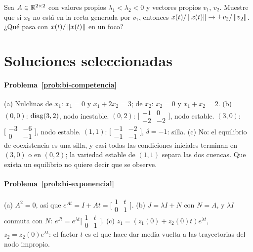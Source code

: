 \begin{problema}\label{prob:bi-tangente}
\etiquetaEstrella{} Sea $A\in\mathbb{R}^{2\times2}$ con valores propios $\lambda_1<\lambda_2<0$ y vectores propios $v_1$, $v_2$. Muestre que si $x_0$ no está en la recta generada por $v_1$, entonces $x(t)/\left\lVert x(t)\right\rVert\to\pm v_2/\left\lVert v_2\right\rVert$. ¿Qué pasa con $x(t)/\left\lVert x(t)\right\rVert$ en un foco?
\end{problema}

\section{Soluciones seleccionadas}

\paragraph{Problema~\ref{prob:bi-competencia}}
(a) Nulclinas de $x_1$: $x_1=0$ y $x_1+2x_2=3$; de $x_2$: $x_2=0$ y $x_1+x_2=2$. (b) $(0,0)$: $\operatorname{diag}(3,2)$, nodo inestable. $(0,2)$: $\bigl[\begin{smallmatrix}-1&0\\-2&-2\end{smallmatrix}\bigr]$, nodo estable. $(3,0)$: $\bigl[\begin{smallmatrix}-3&-6\\0&-1\end{smallmatrix}\bigr]$, nodo estable. $(1,1)$: $\bigl[\begin{smallmatrix}-1&-2\\-1&-1\end{smallmatrix}\bigr]$, $\delta=-1$: silla. (c) No: el equilibrio de coexistencia es una silla, y casi todas las condiciones iniciales terminan en $(3,0)$ o en $(0,2)$; la variedad estable de $(1,1)$ separa las dos cuencas. Que exista un equilibrio no quiere decir que se observe.

\paragraph{Problema~\ref{prob:bi-exponencial}}
(a) $A^2=0$, así que $e^{At}=I+At=\bigl[\begin{smallmatrix}1&t\\0&1\end{smallmatrix}\bigr]$. (b) $J=\lambda I+N$ con $N=A$, y $\lambda I$ conmuta con $N$: $e^{Jt}=e^{\lambda t}\bigl[\begin{smallmatrix}1&t\\0&1\end{smallmatrix}\bigr]$. (c) $z_1=(z_1(0)+z_2(0)t)e^{\lambda t}$, $z_2=z_2(0)e^{\lambda t}$: el factor $t$ es el que hace dar media vuelta a las trayectorias del nodo impropio.

